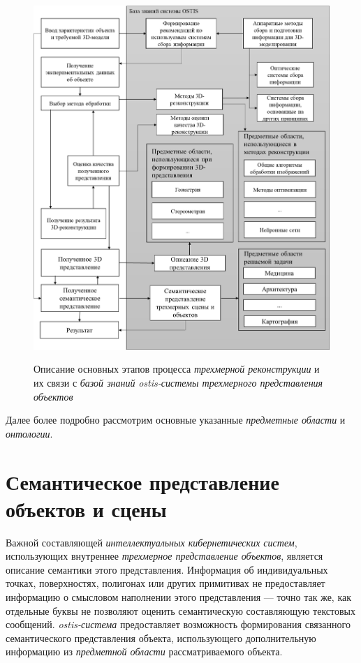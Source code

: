\begin{figure}[H]
    \caption{Описание основных этапов процесса \textit{трехмерной реконструкции} и их связи с \textit{базой знаний} \textit{ostis-системы трехмерного представления объектов}}
    \includegraphics[scale=0.3]{author/part4/figures/schema3D.png}
    \label{fig:schema-3d-reconstruction}
\end{figure}

Далее более подробно рассмотрим основные указанные \textit{предметные области} и \textit{онтологии}.

\section{Семантическое представление объектов и сцены}
\label{sec_3d_models_semantics}

Важной составляющей \textit{интеллектуальных кибернетических систем}, использующих внутреннее \textit{трехмерное представление объектов}, является описание семантики этого представления. Информация об индивидуальных точках, поверхностях, полигонах или других примитивах не предоставляет информацию о смысловом наполнении этого представления --- точно так же, как отдельные буквы не позволяют оценить семантическую составляющую текстовых сообщений. \textit{ostis-система} предоставляет возможность формирования связанного семантического представления объекта, использующего дополнительную информацию из \textit{предметной области} рассматриваемого объекта.

